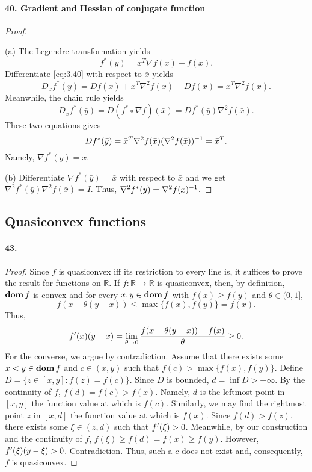   \paragraph{40. Gradient and Hessian of conjugate function}
  \begin{proof}
    $\,$\par
    (a) The Legendre transformation yields
    \begin{equation}
      \label{eq:3.40}
      f^*(\bar{y})=\bar{x}^T\nabla f(\bar{x})-f(\bar{x}).
    \end{equation}
    Differentiate \eqref{eq:3.40} with respect to $\bar{x}$ yields
    \[
      D_{\bar{x}}f^*(\bar{y})=
      Df(\bar{x})+\bar{x}^T\nabla^2f(\bar{x})-Df(\bar{x})=
      \bar{x}^T\nabla^2f(\bar{x}).
    \]
    Meanwhile, the chain rule yields
    \[
      D_{\bar{x}}f^*(\bar{y})=
      D(f^*\circ\nabla f)(\bar{x})=
      Df^*(\bar{y})\nabla^2f(\bar{x}).
    \]
    These two equations gives
    \[
      Df^*(\bar{y})=\bar{x}^T\nabla^2f(\bar{x})(\nabla^2f(\bar{x}))^{-1}=
      \bar{x}^T.
    \]
    Namely, $\nabla f^*(\bar{y})=\bar{x}$.\par
    (b) Differentiate $\nabla f^*(\bar{y})=\bar{x}$ with respect to $\bar{x}$
    and we get $\nabla^2f^*(\bar{y})\nabla^2f(\bar{x})=I$. Thus, $\nabla^2f^*
    (\bar{y})=\nabla^2f(\bar{x})^{-1}$.
  \end{proof}
\subsection{Quasiconvex functions}
  \paragraph{43.}
  \begin{proof}
    Since $f$ is quasiconvex iff its restriction to every line is, it suffices
    to prove the result for functions on $\mathbb{R}$. If $f:\mathbb{R}\to
    \mathbb{R}$ is quasiconvex, then, by definition, $\operatorname{\mathbf{dom}} f$ is convex and
    for every $x,y\in\operatorname{\mathbf{dom}} f$ with $f(x)\ge f(y)$ and $\theta\in(0,1]$,
    \[
      f(x+\theta(y-x))\le \max\{f(x),f(y)\}=f(x).
    \]
    Thus,
    \[
      f^\prime(x)(y-x)=\lim_{\theta\to0}\frac{f(x+\theta(y-x))-f(x)}{\theta}\ge 0.
    \]
    For the converse, we argue by contradiction. Assume that there exists some
    $x<y\in\operatorname{\mathbf{dom}} f$ and $c\in(x,y)$ such that $f(c)>\max\{f(x),f(y)\}$. Define 
    $D=\{z\in[x,y]:f(z)=f(c)\}$. Since $D$ is bounded, $d=\inf D>-\infty$. By
    the continuity of $f$, $f(d)=f(c)>f(x)$. Namely, $d$ is the leftmost point
    in $[x,y]$ the function value at which is $f(c)$. Similarly, we may find
    the rightmost point $z$ in $[x,d]$ the function value at which is $f(x)$.
    Since $f(d)>f(z)$, there exists some $\xi\in(z,d)$ such that $f^\prime(\xi)>0$.
    Meanwhile, by our construction and the continuity of $f$, $f(\xi)\ge f(d)=
    f(x)\ge f(y)$. However, $f^\prime(\xi)(y-\xi)>0$. Contradiction. Thus, such a
    $c$ does not exist and, consequently, $f$ is quasiconvex.
  \end{proof}
